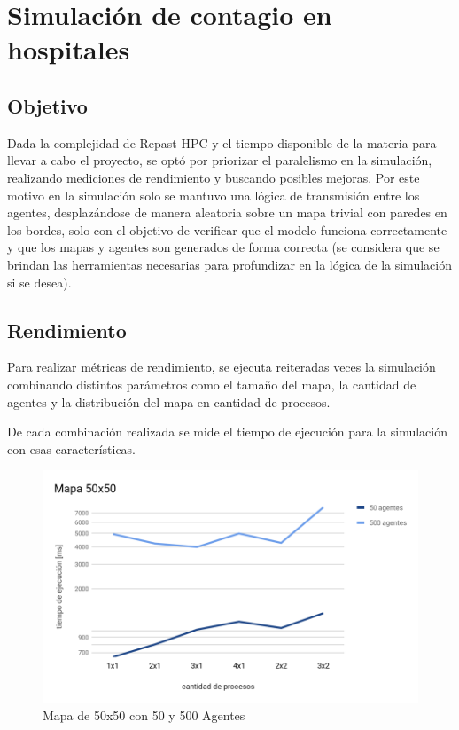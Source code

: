 
\section{Simulación de contagio en hospitales}

\subsection{Objetivo}

Dada la complejidad de Repast HPC y el tiempo disponible de la materia
para llevar a cabo el proyecto, se optó por priorizar el paralelismo en
la simulación, realizando mediciones de rendimiento y buscando posibles
mejoras. Por este motivo en la simulación solo se mantuvo una lógica de
transmisión entre los agentes, desplazándose de manera aleatoria sobre
un mapa trivial con paredes en los bordes, solo con el objetivo de
verificar que el modelo funciona correctamente y que los mapas y agentes
son generados de forma correcta (se considera que se brindan las
herramientas necesarias para profundizar en la lógica de la simulación
si se desea).

\subsection{Rendimiento}

Para realizar métricas de rendimiento, se ejecuta reiteradas veces la
simulación combinando distintos parámetros como el tamaño del mapa, la
cantidad de agentes y la distribución del mapa en cantidad de procesos.

De cada combinación realizada se mide el tiempo de ejecución para la
simulación con esas características.

\begin{figure}[H]
	\centering
	\includegraphics{Rendimiento1.png}
	\caption{Mapa de 50x50 con 50 y 500 Agentes}
\end{figure}

